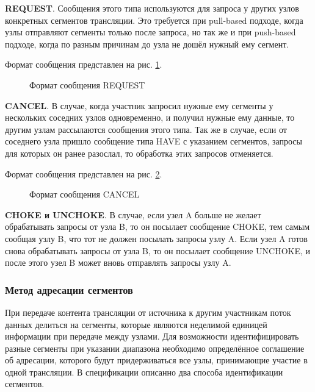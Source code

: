    		\textbf{REQUEST}. Сообщения этого типа используются для запроса у других узлов конкретных сегментов трансляции.
   		Это требуется при pull-based подходе, когда узлы отправляют сегменты только после запроса, но так же и при
   		push-based подходе, когда по разным причинам до узла не дошёл нужный ему сегмент.

   		Формат сообщения представлен на рис. \ref{img:ppspp-message-request}.
		\begin{figure}[h]
			\caption{Формат сообщения REQUEST}
			\label{img:ppspp-message-request}
		\end{figure}

   		\textbf{CANCEL}. В случае, когда участник запросил нужные ему сегменты у нескольких соседних узлов одновременно,
   		и получил нужные ему данные, то другим узлам рассылаются сообщения этого типа. Так же в случае, если от
   		соседнего узла пришло сообщение типа HAVE с указанием сегментов, запросы для которых он ранее разослал, то
   		обработка этих запросов отменяется.

   		Формат сообщения представлен на рис. \ref{img:ppspp-message-cancel}.
		\begin{figure}[h]
			\caption{Формат сообщения CANCEL}
			\label{img:ppspp-message-cancel}
		\end{figure}


   		\textbf{CHOKE и UNCHOKE}. В случае, если узел A больше не желает обрабатывать запросы от узла B, то он
   		посылает сообщение CHOKE, тем самым сообщая узлу B, что тот не должен посылать запросы узлу A. Если узел A готов
   		снова обрабатывать запросы от узла B, то он посылает сообщение UNCHOKE, и после этого узел B может вновь
   		отправлять запросы узлу A.

		\subsubsection{Метод адресации сегментов}
		При передаче контента трансляции от источника к другим участникам поток данных делиться на сегменты, которые
		являются неделимой единицей информации при передаче между узлами. Для возможности идентифицировать разные
		сегменты при указании диапазона необходимо определённое соглашение об адресации, которого будут придерживаться
		все узлы, принимающие участие в одной трансляции. В спецификации описанно два способа идентификации сегментов.

